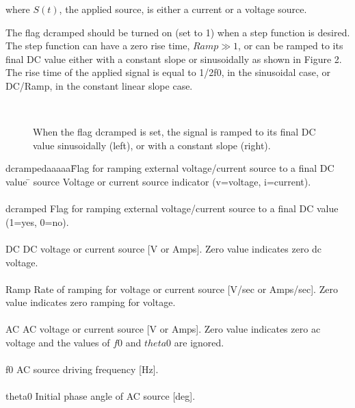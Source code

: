 \begin{section}
\begin{subsection}
\begin{subsubsection}
\noindent
where {\em$S(t)$}, the applied source, is either a current or a voltage source.
\vspace{.2in}

\noindent
      The flag dcramped should be turned on (set to 1) when a step function is
      desired.  The step function can have a zero rise time, $Ramp \gg 1$,
      or can be ramped to its final DC value either with a constant slope or
      sinusoidally as shown in Figure 2. The rise time of the applied signal is
      equal to 1/2f0, in the sinusoidal case, or DC/Ramp, in the constant
      linear slope case.
%
\begin{figure}
\begin{center}
\leavevmode
\hbox{%
\epsfysize 4.0in
\epsfxsize 4.0in
}
\end{center}
\caption{ When the flag dcramped is set, the signal is ramped to its
final DC value sinusoidally (left), or with a constant slope (right).}
\label{SINRAMP}
\end{figure}
%
\noindent
\begin{tabbing}
      dcrampedaaaaa\=  Flag for ramping external voltage/current source to a final
                    DC value \= \kill
      source    \>  Voltage or current source indicator (v=voltage, i=current). \> \\
						\\
      dcramped  \>  Flag for ramping external voltage/current source to a final
                    DC value \> \\
	        \>  (1=yes, 0=no). \> \\
						\\
      DC        \>  DC voltage or current source [V or Amps].  Zero value
                    indicates zero dc \> \\
		\>  voltage. \> \\
						\\
      Ramp      \>  Rate of ramping for voltage or current source [V/sec or
                    Amps/sec].  Zero \> \\
	        \>  value indicates zero ramping for voltage. \> \\
					\\
      AC        \>  AC voltage or current source [V or Amps]. Zero value
                    indicates zero ac \> \\
		\>  voltage and the values of {\em $f0$} and {\em $theta0$}
                    are ignored. \> \\
					\\
      f0        \>  AC source driving frequency [Hz]. \> \\
					\\
      theta0     \>  Initial phase angle of AC source [deg]. \>
\end{tabbing}
\end{subsubsection}


\end{subsection}
\end{section}
